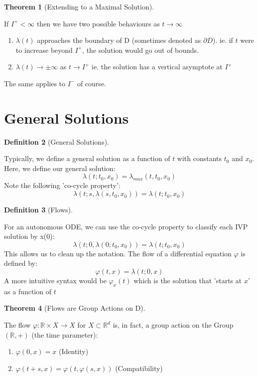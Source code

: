 \documentclass{article}
\newtheorem{thm}{Theorem}[section]
\newtheorem{defn}[thm]{Definition}
\begin{document}
\begin{thm}[Extending to a Maximal Solution]\end{thm}
If $I^+ < \infty$ then we have two possible behaviours as $t \to \infty$
\begin{enumerate}
    \item $\lambda(t)$ approaches the boundary of D (sometimes denoted as $\partial D$).  ie. if $t$ were to increase beyond $I^+$, the solution would go out of bounds.
    \item $\lambda(t) \to ±\infty$ as $t \to I^+$ ie. the solution has a vertical asymptote at $I^+$
\end{enumerate}
The same applies to $I^-$ of course.

\newpage    
\section{General Solutions}

\begin{defn}[General Solutions]
\end{defn}
Typically, we define a general solution as a function of $t$ with constants $t_0$ and $x_0$. Here, we define our general solution:
\[\lambda(t; t_0, x_0) = \lambda_{max}(t, t_0, x_0)\]
Note the following 'co-cycle property':
\[\lambda(t; s, \lambda(s, t_0, x_0)) = \lambda(t; t_0, x_0)\]

\begin{defn}[Flows]
\end{defn}
For an autonomous ODE, we can use the co-cycle property to classify each IVP solution by x(0):
\[\lambda(t; 0, \lambda(0; t_0, x_0)) = \lambda(t; t_0, x_0)\]
This allows us to clean up the notation. The flow of a differential equation $\varphi$ is defined by:
\[\varphi(t, x) = \lambda(t; 0, x)\]
A more intuitive syntax would be $\varphi_x(t)$ which is the solution that 'starts at $x$' as a function of $t$

\begin{thm}[Flows are Group Actions on D]
\end{thm}
The flow $\varphi: \mathbb{R} \times X \to X$ for $X \subset \mathbb{R}^d$ is, in fact, a group action on the Group $(\mathbb{R}, +)$ (the time parameter):
\begin{enumerate}
    \item $\varphi(0, x) = x$ (Identity)
    \item $\varphi(t + s, x) = \varphi(t, \varphi(s, x))$ (Compatibility) 
\end{enumerate}
\end{document}
